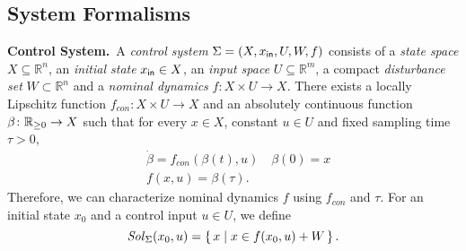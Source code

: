 

\subsection{System Formalisms}
 
\smallskip
\noindent\textbf{Control System.}\
A \emph{control system} $\Sigma = (X, x_{\mathsf{in}}, U, W, f)$
consists of a \emph{state space} $X\subseteq \mathbb{R}^n$,
an \emph{initial state} $x_{\mathsf{in}}\in X$,
 an \emph{input space} $U\subseteq\mathbb{R}^m$, 
a compact \emph{disturbance set} $W\subset \mathbb{R}^n$ and
a \emph{nominal dynamics} $f:X\times U\rightarrow X$. There exists a locally Lipschitz function $f_{con}\colon X\times U\rightarrow X$ and an absolutely continuous function $\beta\colon \mathbb{R}_{\geq 0} \rightarrow X$ such that for every $x\in X$, constant $u\in U$ and fixed sampling time $\tau>0$, 
\begin{align}
	&\dot \beta = f_{con}(\beta(t),u) \quad \beta(0) =x\nonumber\\
	 &f(x,u) =\beta(\tau).\label{eq:cont_to_disc}
\end{align}
Therefore, we can characterize nominal dynamics $f$ using $f_{con}$ and $\tau$. %
For an initial state $x_0$ and a control input $u\in U$, we define
\begin{equation}\label{equ:def_f}
	\mathit{Sol}_\Sigma(x_0,u)=\set{x\mid x\in f(x_0,u) + W}. 
\end{equation} 

